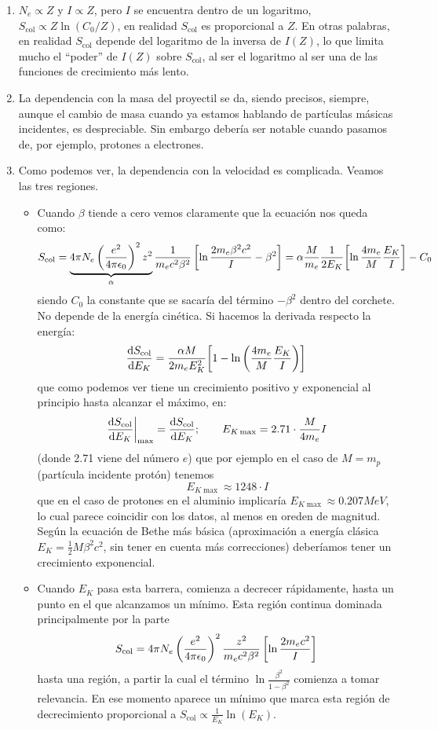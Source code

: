 \begin{enumerate}[label=\alph*)]
    \item $N_e \propto Z$ y $I \propto Z$, pero $I$ se encuentra dentro de un logaritmo, $S_{\text{col}} \propto Z \ln (C_0/Z)$, en realidad $S_{\text{col}}$ es proporcional a $Z$. En otras palabras, en realidad $S_{\text{col}}$ depende del logaritmo de la inversa de $I(Z)$, lo que limita mucho el ``poder'' de $I(Z)$ sobre $S_{\text{col}}$, al ser el logaritmo al ser una de las funciones de crecimiento más lento. 
    \item La dependencia con la masa del proyectil se da, siendo precisos, siempre, aunque el cambio de masa cuando ya estamos hablando de partículas másicas incidentes, es despreciable. Sin embargo debería ser notable cuando pasamos de, por ejemplo, protones a electrones. 
    \item Como podemos ver, la dependencia con la velocidad es complicada. Veamos las tres regiones.
    \begin{itemize}
        \item Cuando $\beta$ tiende a cero vemos claramente que la ecuación nos queda como: 
        \[
        S_\text{\text{col}} = \underbrace{4\pi N_e \left( \frac{e^2}{4\pi \epsilon_0} \right)^2 
        z^2}_{\alpha}\frac{1}{m_e c^2 \beta^2} 
        \left[ \ln \frac{2 m_e \beta^2 c^2}{I} - \beta^2 \right]  = \alpha \frac{M}{m_e} \frac{1}{2E_K} \bqty{\ln \frac{4m_e}{M}\frac{E_K}{I}} - C_0
        \] 
        siendo $C_0$ la constante que se sacaría del término $-\beta^2$ dentro del corchete. No depende de la energía cinética. Si hacemos la derivada respecto la energía: 
        \[
        \dv{S_{\text{col}}}{E_K} = \frac{\alpha M}{2m_e E_K^2} \bqty{ 1  - \ln \pqty{\frac{4m_e}{M}\frac{E_K}{I}}}
        \]
        que como podemos ver tiene un crecimiento positivo y exponencial al principio hasta alcanzar el máximo, en: 
        \[
        \left. \dv{S_{\text{col}}}{E_K}  \right|_{\max} =  \dv{S_{\text{col}}}{E_K}  (E_{K\max}); \qquad E_{K\max} =2.71 \cdot  \frac{M}{4m_e} I
        \]
        (donde 2.71 viene del número $e$) que por ejemplo en el caso de $M=m_p$ (partícula incidente protón) tenemos
        \[ 
        \qquad E_{K\max} \approx 1248 \cdot I
        \]
        que en el caso de protones en el aluminio implicaría $E_{K\max} \approx 0.207 \unit{MeV}$, lo cual parece coincidir con los datos, al menos en oreden de magnitud. Según la ecuación de Bethe más básica (aproximación a energía clásica $E_K = \frac{1}{2} M\beta^2 c^2$, sin tener en cuenta más correcciones) deberíamos tener un crecimiento exponencial.
        \item Cuando $E_{K}$ pasa esta barrera, comienza a decrecer rápidamente, hasta un punto en el que alcanzamos un mínimo. Esta región continua dominada principalmente por la parte 
        \[
        S_\text{\text{col}} = 4\pi N_e \left( \frac{e^2}{4\pi \epsilon_0} \right)^2 
        \frac{z^2}{m_e c^2 \beta^2} 
        \left[ \ln \frac{2 m_e c^2}{I}  \right]
        \]
        hasta una región, a partir la cual el término $ \ln \frac{\beta^2}{1 - \beta^2} $ comienza a tomar relevancia. En ese momento aparece un mínimo que marca esta región de decrecimiento proporcional a $S_{\text{col}} \propto \frac{1}{E_K} \ln (E_K)$.        
        

\end{itemize}
\end{enumerate}
